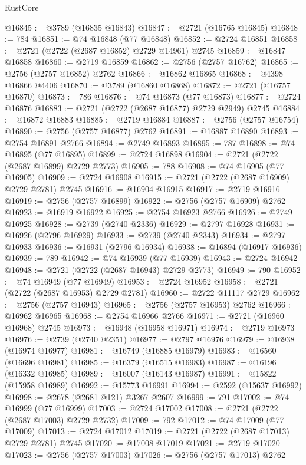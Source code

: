 \begin{lexlean}{RustCore}
\begin{coremodule}
@16845 := @3789 (@16835 @16843)
@16847 := @2721 (@16765 @16845)
@16848 := 784
@16851 := @74 @16848 (@77 @16848)
@16852 := @2724 @16851
@16858 := @2721 (@2722 (@2687 @16852) @2729 @14961) @2745
@16859 := @16847 @16858
@16860 := @2719 @16859
@16862 := @2756 (@2757 @16762)
@16865 := @2756 (@2757 @16852) @2762
@16866 := @16862 @16865
@16868 := @4398 @16866 @4406
@16870 := @3789 (@16860 @16868)
@16872 := @2721 (@16757 @16870)
@16873 := 786
@16876 := @74 @16873 (@77 @16873)
@16877 := @2724 @16876
@16883 := @2721 (@2722 (@2687 @16877) @2729 @2949) @2745
@16884 := @16872 @16883
@16885 := @2719 @16884
@16887 := @2756 (@2757 @16754)
@16890 := @2756 (@2757 @16877) @2762
@16891 := @16887 @16890
@16893 := @2754 @16891 @2766
@16894 := @2749 @16893
@16895 := 787
@16898 := @74 @16895 (@77 @16895)
@16899 := @2724 @16898
@16904 := @2721 (@2722 (@2687 @16899) @2729 @2773)
@16905 := 788
@16908 := @74 @16905 (@77 @16905)
@16909 := @2724 @16908
@16915 := @2721 (@2722 (@2687 @16909) @2729 @2781) @2745
@16916 := @16904 @16915
@16917 := @2719 @16916
@16919 := @2756 (@2757 @16899)
@16922 := @2756 (@2757 @16909) @2762
@16923 := @16919 @16922
@16925 := @2754 @16923 @2766
@16926 := @2749 @16925
@16928 := @2739 (@2740 @2336)
@16929 := @2797 @16928
@16931 := @16926 (@2796 @16929)
@16933 := @2739 (@2740 @2343)
@16934 := @2797 @16933
@16936 := @16931 (@2796 @16934)
@16938 := @16894 (@16917 @16936)
@16939 := 789
@16942 := @74 @16939 (@77 @16939)
@16943 := @2724 @16942
@16948 := @2721 (@2722 (@2687 @16943) @2729 @2773)
@16949 := 790
@16952 := @74 @16949 (@77 @16949)
@16953 := @2724 @16952
@16958 := @2721 (@2722 (@2687 @16953) @2729 @2781)
@16960 := @2722 @11117 @2729
@16962 := @2756 (@2757 @16943)
@16965 := @2756 (@2757 @16953) @2762
@16966 := @16962 @16965
@16968 := @2754 @16966 @2766
@16971 := @2721 (@16960 @16968) @2745
@16973 := @16948 (@16958 @16971)
@16974 := @2719 @16973
@16976 := @2739 (@2740 @2351)
@16977 := @2797 @16976
@16979 := @16938 (@16974 @16977)
@16981 := @16749 (@16885 @16979)
@16983 := @16560 (@16696 @16981)
@16985 := @16379 (@16515 @16983)
@16987 := @16196 (@16332 @16985)
@16989 := @16007 (@16143 @16987)
@16991 := @15822 (@15958 @16989)
@16992 := @15773 @16991
@16994 := @2592 (@15637 @16992)
@16998 := @2678 (@2681 @121) @3267 @2607
@16999 := 791
@17002 := @74 @16999 (@77 @16999)
@17003 := @2724 @17002
@17008 := @2721 (@2722 (@2687 @17003) @2729 @2732)
@17009 := 792
@17012 := @74 @17009 (@77 @17009)
@17013 := @2724 @17012
@17019 := @2721 (@2722 (@2687 @17013) @2729 @2781) @2745
@17020 := @17008 @17019
@17021 := @2719 @17020
@17023 := @2756 (@2757 @17003)
@17026 := @2756 (@2757 @17013) @2762

\end{coremodule}
\end{lexlean}
